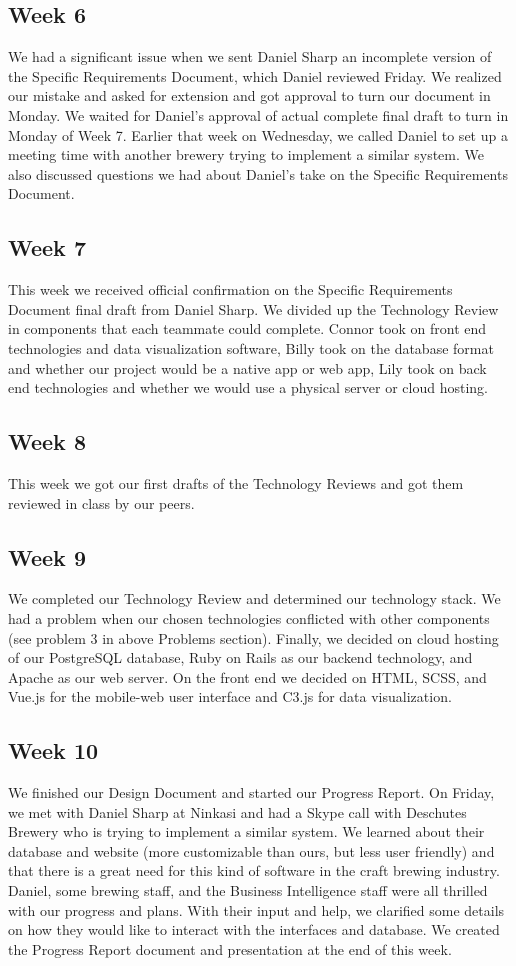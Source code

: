 \documentclass[draftclsnofoot,onecolumn,letterpaper,10pt,compsoc]{IEEEtran}
\begin{document}
\subsection{Week 6}
We had a significant issue when we sent Daniel Sharp an incomplete version of the Specific Requirements Document, which Daniel reviewed Friday.
We realized our mistake and asked for extension and got approval to turn our document in Monday.
We waited for Daniel’s approval of actual complete final draft to turn in Monday of Week 7.
Earlier that week on Wednesday, we called Daniel to set up a meeting time with another brewery trying to implement a similar system.
We also discussed questions we had about Daniel’s take on the Specific Requirements Document.

\subsection{Week 7}
This week we received official confirmation on the Specific Requirements Document final draft from Daniel Sharp.
We divided up the Technology Review in components that each teammate could complete.
Connor took on front end technologies and data visualization software, Billy took on the database format and whether our project would be a native app or web app, Lily took on back end technologies and whether we would use a physical server or cloud hosting.

\subsection{Week 8}
This week we got our first drafts of the Technology Reviews and got them reviewed in class by our peers.

\subsection{Week 9}
We completed our Technology Review and determined our technology stack.
We had a problem when our chosen technologies conflicted with other components (see problem 3 in above Problems section).
Finally, we decided on cloud hosting of our PostgreSQL database, Ruby on Rails as our backend technology, and Apache as our web server.
On the front end we decided on HTML, SCSS, and Vue.js for the mobile-web user interface and C3.js for data visualization.

\subsection{Week 10}
We finished our Design Document and started our Progress Report.
On Friday, we met with Daniel Sharp at Ninkasi and had a Skype call with Deschutes Brewery who is trying to implement a similar system.
We learned about their database and website (more customizable than ours, but less user friendly) and that there is a great need for this kind of software in the craft brewing industry.
Daniel, some brewing staff, and the Business Intelligence staff were all thrilled with our progress and plans.
With their input and help, we clarified some details on how they would like to interact with the interfaces and database.
We created the Progress Report document and presentation at the end of this week.
\end{document}
